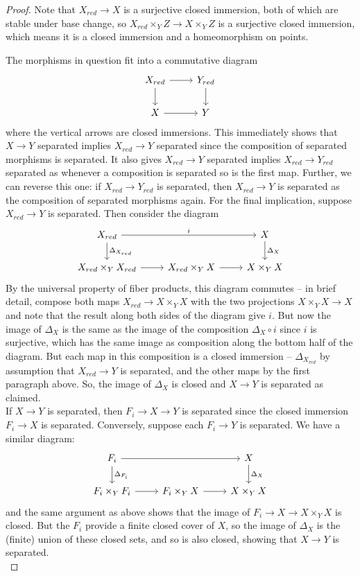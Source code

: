 \begin{proof}
	Note that $X_{red} \to X$ is a surjective closed immersion, both of which are stable under base change, so $X_{red} \times_Y Z \to X \times_Y Z$ is a surjective closed immersion, which means it is a closed immersion and a homeomorphism on points.
	
	The morphisms in question fit into a commutative diagram
	\[ \begin{tikzcd} X_{red} \arrow[r] \arrow[d] & Y_{red} \arrow[d] \\ X \arrow[r] & Y \end{tikzcd} \]
	where the vertical arrows are closed immersions. This immediately shows that $X \to Y$ separated implies $X_{red} \to Y$ separated since the composition of separated morphisms is separated. It also gives $X_{red} \to Y$ separated implies $X_{red} \to Y_{red}$ separated as whenever a composition is separated so is the first map. Further, we can reverse this one: if $X_{red} \to Y_{red}$ is separated, then $X_{red} \to Y$ is separated as the composition of separated morphisms again. For the final implication, suppose $X_{red} \to Y$ is separated. Then consider the diagram
	\[ \begin{tikzcd} X_{red} \arrow[rr,"i"] \arrow[d,"\Delta_{X_{red}}"] & & X \arrow[d,"\Delta_X"] \\ X_{red} \times_Y X_{red} \arrow[r] & X_{red} \times_Y X \arrow[r] & X \times_Y X \end{tikzcd} \]
	By the universal property of fiber products, this diagram commutes -- in brief detail, compose both maps $X_{red} \to X \times_Y X$ with the two projections $X \times_Y X \to X$ and note that the result along both sides of the diagram give $i$. But now the image of $\Delta_X$ is the same as the image of the composition $\Delta_X \circ i$ since $i$ is surjective, which has the same image as composition along the bottom half of the diagram. But each map in this composition is a closed immersion -- $\Delta_{X_{red}}$ by assumption that $X_{red} \to Y$ is separated, and the other maps by the first paragraph above. So, the image of $\Delta_X$ is closed and $X \to Y$ is separated as claimed. \\
	
	If $X \to Y$ is separated, then $F_i \to X \to Y$ is separated since the closed immersion $F_i \to X$ is separated. Conversely, suppose each $F_i \to Y$ is separated. We have a similar diagram:
	\[ \begin{tikzcd} F_i \arrow[rr] \arrow[d,"\Delta_{F_i}"] & & X \arrow[d,"\Delta_X"] \\ F_i \times_Y F_i \arrow[r] & F_i \times_Y X \arrow[r] & X \times_Y X \end{tikzcd} \]
	and the same argument as above shows that the image of $F_i \to X \to X \times_Y X$ is closed. But the $F_i$ provide a finite closed cover of $X$, so the image of $\Delta_X$ is the (finite) union of these closed sets, and so is also closed, showing that $X \to Y$ is separated. \\
	

\end{proof}
